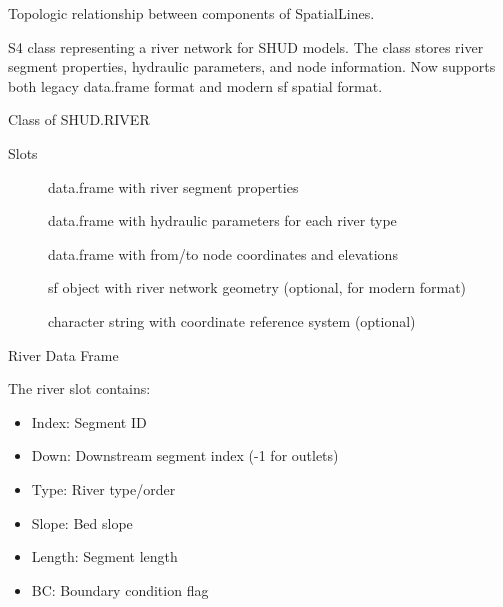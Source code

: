 \documentclass[a4paper]{book}
\begin{document}
%
\begin{Value}
Topologic relationship between components of SpatialLines.
\end{Value}
%
\begin{Description}\relax
S4 class representing a river network for SHUD models.
The class stores river segment properties, hydraulic parameters,
and node information. Now supports both legacy data.frame format
and modern sf spatial format.
\end{Description}
%
\begin{Value}
Class of SHUD.RIVER
\end{Value}
%
\begin{Section}{Slots}

\begin{description}

\item[] data.frame with river segment properties

\item[] data.frame with hydraulic parameters for each river type

\item[] data.frame with from/to node coordinates and elevations

\item[] sf object with river network geometry (optional, for modern format)

\item[] character string with coordinate reference system (optional)

\end{description}
\end{Section}
%
\begin{Section}{River Data Frame}

The river slot contains:
\begin{itemize}

\item{} Index: Segment ID
\item{} Down: Downstream segment index (-1 for outlets)
\item{} Type: River type/order
\item{} Slope: Bed slope
\item{} Length: Segment length
\item{} BC: Boundary condition flag

\end{itemize}

\end{Section}
\end{document}

